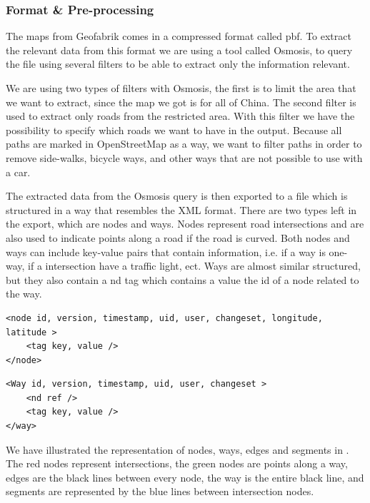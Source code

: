 \subsubsection{Format \& Pre-processing}
The maps from Geofabrik comes in a compressed format called pbf. To extract the relevant data from this format we are using a tool called Osmosis, to query the file using several filters to be able to extract only the information relevant.

We are using two types of filters with Osmosis, the first is to limit the area that we want to extract, since the map we got is for all of China. The second filter is used to extract only roads from the restricted area. With this filter we have the possibility to specify which roads we want to have in the output. Because all paths are marked in OpenStreetMap as a way, we want to filter paths in order to remove side-walks, bicycle ways, and other ways that are not possible to use with a car.

The extracted data from the Osmosis query is then exported to a file which is structured in a way that resembles the XML format. There are two types left in the export, which are nodes and ways. Nodes represent road intersections and are also used to indicate points along a road if the road is curved. Both nodes and ways can include key-value pairs that contain information, i.e. if a way is one-way, if a intersection have a traffic light, ect.
Ways are almost similar structured, but they also contain a nd tag which contains a value the id of a node related to the way.

\begin{lstlisting}[style=XML, caption=Node representation]
<node id, version, timestamp, uid, user, changeset, longitude, latitude >
	<tag key, value />
</node>
\end{lstlisting}

\begin{lstlisting}[style=XML, caption=Way representation]
<Way id, version, timestamp, uid, user, changeset >
	<nd ref />
	<tag key, value />
</way>
\end{lstlisting}

We have illustrated the representation of nodes, ways, edges and segments in . The red nodes represent intersections, the green nodes are points along a way, edges are the black lines between every node, the way is the entire black line, and segments are represented by the blue lines between intersection nodes.

